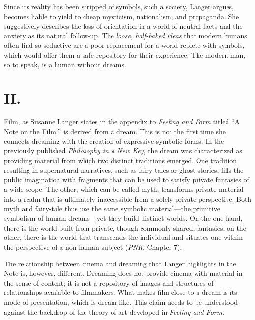 \documentclass{tufte-handout}
\begin{document}
\noindent Since its reality has been stripped of symbols, such a society, Langer
argues, becomes liable to yield to cheap mysticism, nationalism, and
propaganda. She suggestively describes the loss of orientation in a
world of neutral facts and the anxiety as its natural follow-up. The
\emph{loose, half-baked ideas} that modern humans often find so
seductive are a poor replacement for a world replete with symbols, which
would offer them a safe repository for their experience. The modern man,
so to speak, is a human without dreams.

\hypertarget{ii}{%
\section{II.}\label{ii}}

Film, as Susanne Langer states in the appendix to \emph{Feeling and
Form} titled ``A Note on the Film,'' is derived from a dream. This is
not the first time she connects dreaming with the creation of expressive
symbolic forms. In the previously published \emph{Philosophy in a New
Key}, the dream was characterized as providing material from which two
distinct traditions emerged. One tradition resulting in supernatural
narratives, such as fairy-tales or ghost stories, fills the public
imagination with fragments that can be used to satisfy private fantasies
of a wide scope. The other, which can be called myth, transforms private
material into a realm that is ultimately inaccessible from a solely
private perspective. Both myth and fairy-tale thus use the same symbolic
material---the primitive symbolism of human dreams---yet they build
distinct worlds. On the one hand, there is the world built from private,
though commonly shared, fantasies; on the other, there is the world that
transcends the individual and situates one within the perspective of a
non-human subject (\emph{PNK}, Chapter 7).

The relationship between cinema and dreaming that Langer highlights in
the Note is, however, different. Dreaming does not provide cinema with
material in the sense of content; it is not a repository of images and
structures of relationships available to filmmakers. What makes film
close to a dream is its mode of presentation, which is dream-like. This
claim needs to be understood against the backdrop of the theory of art
developed in \emph{Feeling and Form}.
\end{document}
